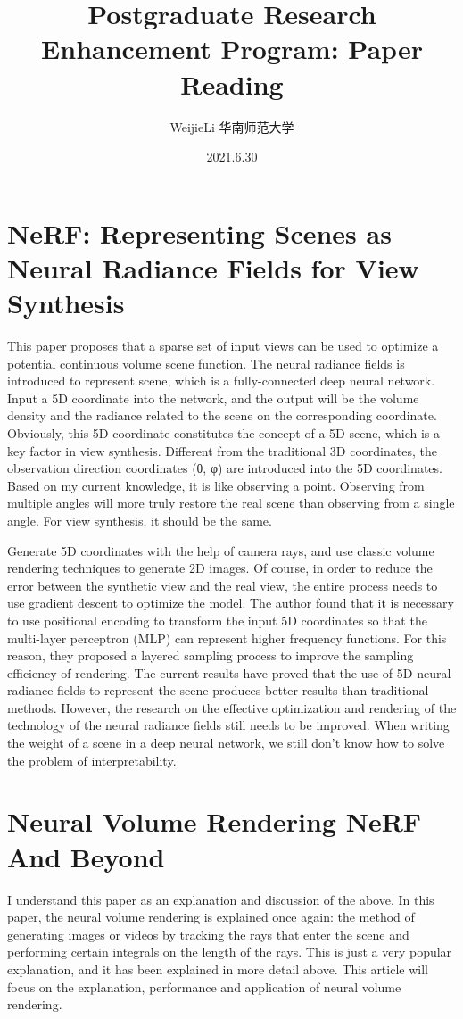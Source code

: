 \documentclass[UTF-8]{ctexart}
\title{Postgraduate Research Enhancement Program: Paper Reading}
\author{WeijieLi \quad 华南师范大学}
\date{2021.6.30}
\begin{document}
\maketitle
\thispagestyle{empty}
\clearpage

\pagestyle{plain}
\setcounter{page}{1}

\section{NeRF: Representing Scenes as Neural Radiance Fields for View Synthesis}
This paper proposes that a sparse set of input views can be used to optimize a potential continuous volume scene function. The neural radiance fields is introduced to represent scene, which is a fully-connected deep neural network. Input a 5D coordinate into the network, and the output will be the volume density and the radiance related to the scene on the corresponding coordinate. Obviously, this 5D coordinate constitutes the concept of a 5D scene, which is a key factor in view synthesis. Different from the traditional 3D coordinates, the observation direction coordinates (θ, φ) are introduced into the 5D coordinates. Based on my current knowledge, it is like observing a point. Observing from multiple angles will more truly restore the real scene than observing from a single angle. For view synthesis, it should be the same. \par

Generate 5D coordinates with the help of camera rays, and use classic volume rendering techniques to generate 2D images. Of course, in order to reduce the error between the synthetic view and the real view, the entire process needs to use gradient descent to optimize the model. The author found that it is necessary to use positional encoding to transform the input 5D coordinates so that the multi-layer perceptron (MLP) can represent higher frequency functions. For this reason, they proposed a layered sampling process to improve the sampling efficiency of rendering. The current results have proved that the use of 5D neural radiance fields to represent the scene produces better results than traditional methods. However, the research on the effective optimization and rendering of the technology of the neural radiance fields still needs to be improved. When writing the weight of a scene in a deep neural network, we still don't know how to solve the problem of interpretability.

\section{Neural Volume Rendering NeRF And Beyond}
I understand this paper as an explanation and discussion of the above. In this paper, the neural volume rendering is explained once again: the method of generating images or videos by tracking the rays that enter the scene and performing certain integrals on the length of the rays. This is just a very popular explanation, and it has been explained in more detail above. This article will focus on the explanation, performance and application of neural volume rendering.\par
\end{document}
